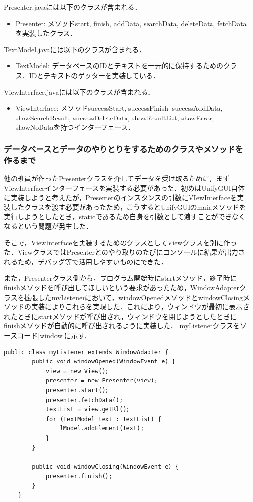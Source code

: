 \documentclass[12pt]{jarticle}
\begin{document}
Presenter.javaには以下のクラスが含まれる．
\begin{itemize}
\item Presenter: メソッドstart, finish, addData, searchData, deleteData, fetchDataを実装したクラス．
\end{itemize}

TextModel.javaには以下のクラスが含まれる．
\begin{itemize}
\item TextModel: データベースのIDとテキストを一元的に保持するためのクラス．IDとテキストのゲッターを実装している．
\end{itemize}

ViewInterface.javaには以下のクラスが含まれる．
\begin{itemize}
\item ViewInterface: メソッドsuccessStart, successFinish, successAddData, showSearchResult, successDeleteData, showResultList, showError, showNoDataを持つインターフェース．
\end{itemize}

\subsubsection{データベースとデータのやりとりをするためのクラスやメソッドを作るまで}
他の班員が作ったPresenterクラスを介してデータを受け取るために，まずViewInterfaceインターフェースを実装する必要があった．初めはUnifyGUI自体に実装しようと考えたが，Presenterのインスタンスの引数にVIewInterfaceを実装したクラスを渡す必要があったため，こうするとUnifyGUIのmainメソッドを実行しようとしたとき，staticであるため自身を引数として渡すことができなくなるという問題が発生した．

そこで，ViewInterfaceを実装するためのクラスとしてViewクラスを別に作った．ViewクラスではPresenterとのやり取りのたびにコンソールに結果が出力されるため，デバッグ等で活用しやすいものにできた．

また，Presenterクラス側から，プログラム開始時にstartメソッド，終了時にfinishメソッドを呼び出してほしいという要求があったため，WindowAdapterクラスを拡張したmyListenerにおいて，windowOpenedメソッドとwindowClosingメソッドの実装によりこれらを実現した．これにより，ウィンドウが最初に表示されたときにstartメソッドが呼び出され，ウィンドウを閉じようとしたときにfinishメソッドが自動的に呼び出されるように実装した．
myListenerクラスをソースコード\ref{window}に示す．

\begin{lstlisting}[caption=myListenerクラス, label=window]
    public class myListener extends WindowAdapter {
        public void windowOpened(WindowEvent e) {
            view = new View();
            presenter = new Presenter(view);
            presenter.start();
            presenter.fetchData();
            textList = view.getRl();
            for (TextModel text : textList) {
                lModel.addElement(text);
            }
        }

        public void windowClosing(WindowEvent e) {
            presenter.finish();
        }
    }
\end{lstlisting}
\end{document}
